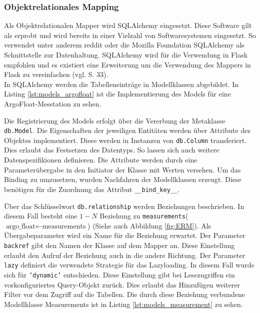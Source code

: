 \subsubsection{Objektrelationales Mapping}\label{sec:implementierungORM}


Als Objektrelationalen Mapper wird SQLAlchemy eingesetzt. Diese Software gilt als erprobt und wird bereits in einer Vielzahl von Softwaresystemen eingesetzt. So verwendet unter anderem reddit oder die Mozilla Foundation SQLAlchemy als Schnittstelle zur Datenhaltung. SQLAlchemy wird für die Verwendung in Flask empfohlen und es existiert eine Erweiterung um die Verwendung des Mappers in Flask zu vereinfachen (vgl. \cite{openingtheflask} S. 33). \\


In SQLAlchemy werden die Tabelleneinträge in Modellklassen abgebildet. In Listing \ref{lst:models_argofloat} ist die Implementierung des Models für eine ArgoFloat-Messtation zu sehen.

    
Die Registrierung des Models erfolgt über die Vererbung der Metaklasse \texttt{db.Model}. Die Eigenschaften der jeweiligen Entitäten werden über Attribute des Objektes implementiert. Diese werden in Instanzen von \texttt{db.Column} transferiert. Dies erlaubt das Festsetzen des Datentyps. So lassen sich auch weitere Datenspezifikionen definieren.  Die Attribute werden durch eine Parameterübergabe in den Initiator der Klasse mit Werten versehen.  
Um das Binding zu umzusetzen, wurden Nachfahren der Modellklassen erzeugt. Diese benötigen für die Zuordnung das Attribut \texttt{\_\_bind\_key\_\_}.

Über das Schlüsselwort \texttt{db.relationship} werden Beziehungen beschrieben. In diesem Fall besteht eine $1 - N$ Beziehung  zu \texttt{measurements}($\mbox{argo\_float} \leftarrow \mbox{measurements}$)  (Siehe auch Abbildung \ref{fig:ERM}). Als Übergabeparameter wird ein Name für die Beziehung erwartet. Der Parameter \texttt{backref} gibt den Namen der Klasse auf dem Mapper an. Diese Einstellung erlaubt den Aufruf der Beziehung auch in die andere Richtung. Der Parameter \texttt{lazy} definiert die verwendete Strategie für das Lazyloading. In diesem Fall wurde sich für \texttt{'dynamic'} entschieden. Diese Einstellung gibt bei Lesezugriffen ein vorkonfiguriertes Query-Objekt zurück. Dies erlaubt das Hinzufügen weiterer Filter vor dem Zugriff auf die Tabellen. Die durch diese Beziehung verbundene Modellklasse Measurements ist in Listing \ref{lst:models_measurement} zu sehen.

